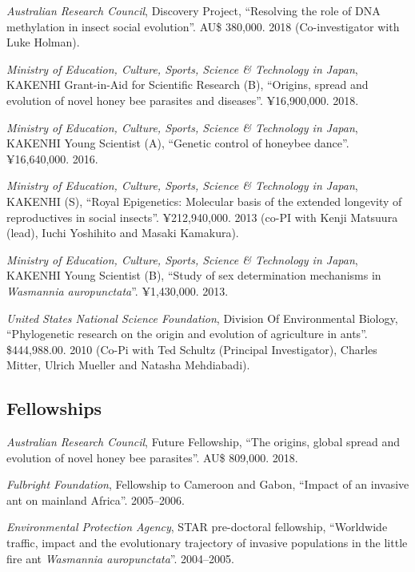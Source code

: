 \documentclass[11pt]{article}
\begin{document}
\ind \textit{Australian Research Council}, Discovery Project, ``Resolving the role of DNA methylation in insect social evolution''.  AU\$ 380,000. 2018 (Co-investigator with Luke Holman).


\ind \textit{Ministry of Education, Culture, Sports, Science \& Technology in Japan}, KAKENHI Grant-in-Aid for Scientific Research (B), ``Origins, spread and evolution of novel honey bee parasites and diseases''.  ¥16,900,000. 2018.


\ind \textit{Ministry of Education, Culture, Sports, Science \& Technology in Japan}, KAKENHI Young Scientist (A), ``Genetic control of honeybee dance''.  ¥16,640,000. 2016.


\ind \textit{Ministry of Education, Culture, Sports, Science \& Technology in Japan}, KAKENHI (S), ``Royal Epigenetics: Molecular basis of the extended longevity of
reproductives in social insects''.  ¥212,940,000. 2013 (co-PI with Kenji Matsuura (lead), Iuchi Yoshihito and Masaki Kamakura).


\ind \textit{Ministry of Education, Culture, Sports, Science \& Technology in Japan}, KAKENHI Young Scientist (B), ``Study of sex determination mechanisms in \textit{Wasmannia auropunctata}''.  ¥1,430,000. 2013.


\ind \textit{United States National Science Foundation}, Division Of Environmental Biology, ``Phylogenetic research on the origin and evolution of agriculture in ants''.  \$444,988.00. 2010 (Co-Pi with Ted Schultz (Principal Investigator), Charles Mitter, Ulrich
Mueller and Natasha Mehdiabadi).





\subsection{Fellowships}


\ind \textit{Australian Research Council}, Future Fellowship, ``The origins, global spread and evolution of novel honey bee parasites''.  AU\$ 809,000. 2018.








\ind \textit{Fulbright Foundation}, Fellowship to Cameroon and Gabon, ``Impact of an invasive ant on mainland Africa''.  2005--2006.


\ind \textit{Environmental Protection Agency}, STAR pre-doctoral fellowship, ``Worldwide traffic, impact and the evolutionary trajectory of invasive
populations in the little fire ant \textit{Wasmannia auropunctata}''.  2004--2005.
\end{document}
